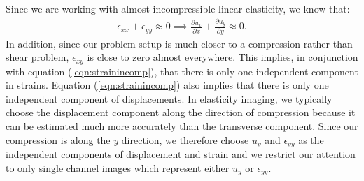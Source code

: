 \documentclass[10pt]{article}
\newcommand{\pdd}[2]{\frac{\partial{{#1}}}{\partial{#2}}}
\begin{document}
Since we are working with almost incompressible linear elasticity, we know \cite{book:hugheslinear} that:
\begin{align}
  \epsilon_{xx}+\epsilon_{yy}\approx{0} \implies \pdd{u_x}{x} + \pdd{u_y}{y} \approx{0} \label{eqn:strainincomp}. 
\end{align}
In addition, since our problem setup is much closer to a compression rather than shear problem, $\epsilon_{xy}$ is close to zero almost everywhere. This implies, in conjunction with equation (\ref{eqn:strainincomp}), that there is only one independent component in strains. Equation (\ref{eqn:strainincomp}) also implies that there is only one independent component of displacements. In elasticity imaging, we typically choose the displacement component along the direction of compression because it can be estimated much more accurately than the transverse component. Since our compression is along the $y$ direction, we therefore choose $u_y$ and $\epsilon_{yy}$ as the independent components of displacement and strain and we restrict our attention to only single channel images which represent either $u_y$ or $\epsilon_{yy}$.
\end{document}
